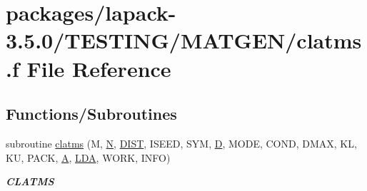 \hypertarget{clatms_8f}{}\section{packages/lapack-\/3.5.0/\+T\+E\+S\+T\+I\+N\+G/\+M\+A\+T\+G\+E\+N/clatms.f File Reference}
\label{clatms_8f}
\subsection*{Functions/\+Subroutines}
\begin{DoxyCompactItemize}
\item 
subroutine \hyperlink{group__complex__matgen_ga411f64e8d8b980e985c6b0189139dc49}{clatms} (M, \hyperlink{polmisc_8c_a0240ac851181b84ac374872dc5434ee4}{N}, \hyperlink{superlu__enum__consts_8h_af00a42ecad444bbda75cde1b64bd7e72ac04fbbdf0d80a4ad25e565541deeebd7}{D\+I\+S\+T}, I\+S\+E\+E\+D, S\+Y\+M, \hyperlink{odrpack_8h_a7dae6ea403d00f3687f24a874e67d139}{D}, M\+O\+D\+E, C\+O\+N\+D, D\+M\+A\+X, K\+L, K\+U, P\+A\+C\+K, \hyperlink{classA}{A}, \hyperlink{example__user_8c_ae946da542ce0db94dced19b2ecefd1aa}{L\+D\+A}, W\+O\+R\+K, I\+N\+F\+O)
\begin{DoxyCompactList}\small\item\em {\bfseries C\+L\+A\+T\+M\+S} \end{DoxyCompactList}\end{DoxyCompactItemize}
